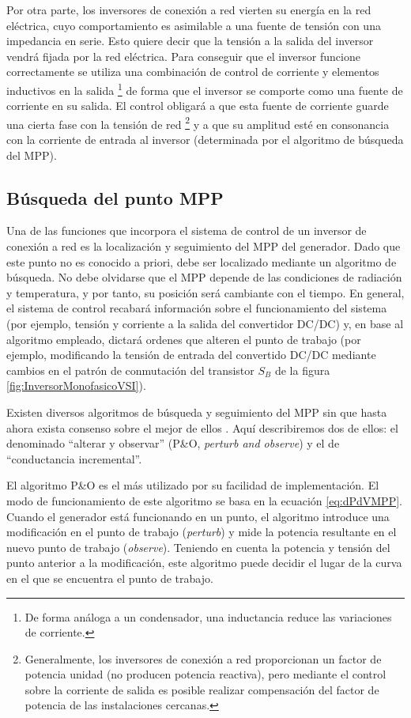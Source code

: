 Por otra parte, los inversores de conexión a red vierten su energía
en la red eléctrica, cuyo comportamiento es asimilable a una fuente
de tensión con una impedancia en serie. Esto quiere decir que la tensión
a la salida del inversor vendrá fijada por la red eléctrica. Para
conseguir que el inversor funcione correctamente se utiliza una combinación
de control de corriente y elementos inductivos en la salida%
\footnote{De forma análoga a un condensador, una inductancia reduce las variaciones
de corriente.%
} de forma que el inversor se comporte como una fuente de corriente
en su salida. El control obligará a que esta fuente de corriente guarde
una cierta fase con la tensión de red%
\footnote{Generalmente, los inversores de conexión a red proporcionan un factor
de potencia unidad (no producen potencia reactiva), pero mediante
el control sobre la corriente de salida es posible realizar compensación
del factor de potencia de las instalaciones cercanas.%
} y a que su amplitud esté en consonancia con la corriente de entrada
al inversor (determinada por el algoritmo de búsqueda del MPP).


\subsection{Búsqueda del punto MPP\label{sub:BusquedaMPP}}

Una de las funciones que incorpora el sistema de control de un inversor
de conexión a red es la localización y seguimiento del MPP del generador.
Dado que este punto no es conocido a priori, debe ser localizado mediante
un algoritmo de búsqueda. No debe olvidarse que el MPP depende de
las condiciones de radiación y temperatura, y por tanto, su posición
será cambiante con el tiempo. En general, el sistema de control recabará
información sobre el funcionamiento del sistema (por ejemplo, tensión
y corriente a la salida del convertidor DC/DC) y, en base al algoritmo
empleado, dictará ordenes que alteren el punto de trabajo (por ejemplo,
modificando la tensión de entrada del convertido DC/DC mediante cambios
en el patrón de conmutación del transistor $S_{B}$ de la figura \ref{fig:InversorMonofasicoVSI}). 

Existen diversos algoritmos de búsqueda y seguimiento del MPP sin
que hasta ahora exista consenso sobre el mejor de ellos \citep{Hohn.Ropp2002}.
Aquí describiremos dos de ellos: el denominado {}``alterar y observar''
(P\&O, \emph{perturb and observe}) y el de {}``conductancia incremental''. 

El algoritmo P\&O es el más utilizado por su facilidad de implementación.
El modo de funcionamiento de este algoritmo se basa en la ecuación
\ref{eq:dPdVMPP}. Cuando el generador está funcionando en un punto,
el algoritmo introduce una modificación en el punto de trabajo (\emph{perturb})
y mide la potencia resultante en el nuevo punto de trabajo (\emph{observe}).
Teniendo en cuenta la potencia y tensión del punto anterior a la modificación,
este algoritmo puede decidir el lugar de la curva en el que se encuentra
el punto de trabajo. 

